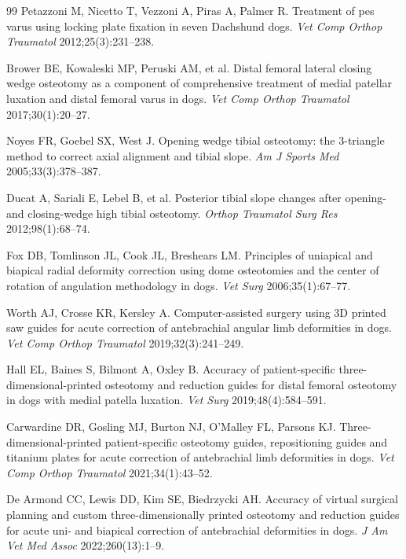 \begin{thebibliography}{99}
 Petazzoni M, Nicetto T, Vezzoni A, Piras A, Palmer R. Treatment of pes varus using locking
plate fixation in seven Dachshund dogs. \emph{Vet Comp Orthop Traumatol} 2012;25(3):231--238.

 Brower BE, Kowaleski MP, Peruski AM, et al. Distal femoral lateral closing wedge osteotomy as a
component of comprehensive treatment of medial patellar luxation and distal femoral varus in dogs. \emph{Vet Comp
Orthop Traumatol} 2017;30(1):20--27. 

 Noyes FR, Goebel SX, West J. Opening wedge tibial osteotomy: the 3-triangle method to correct axial
alignment and tibial slope. \emph{Am J Sports Med} 2005;33(3):378--387. 

 Ducat A, Sariali E, Lebel B, et al. Posterior tibial slope changes after opening- and
closing-wedge high tibial osteotomy. \emph{Orthop Traumatol Surg Res} 2012;98(1):68--74. 

 Fox DB, Tomlinson JL, Cook JL, Breshears LM. Principles of uniapical and biapical radial deformity
correction using dome osteotomies and the center of rotation of angulation methodology in dogs. \emph{Vet Surg}
2006;35(1):67--77. 

 Worth AJ, Crosse KR, Kersley A. Computer-assisted surgery using 3D printed saw guides for acute
correction of antebrachial angular limb deformities in dogs. \emph{Vet Comp Orthop Traumatol} 2019;32(3):241--249.

 Hall EL, Baines S, Bilmont A, Oxley B. Accuracy of patient-specific three-dimensional-printed
osteotomy and reduction guides for distal femoral osteotomy in dogs with medial patella luxation. \emph{Vet Surg}
2019;48(4):584--591. 

 Carwardine DR, Gosling MJ, Burton NJ, O'Malley FL, Parsons KJ. Three-dimensional-printed
patient-specific osteotomy guides, repositioning guides and titanium plates for acute correction of antebrachial limb
deformities in dogs. \emph{Vet Comp Orthop Traumatol} 2021;34(1):43--52. 

 De Armond CC, Lewis DD, Kim SE, Biedrzycki AH. Accuracy of virtual surgical planning and custom
three-dimensionally printed osteotomy and reduction guides for acute uni- and biapical correction of antebrachial
deformities in dogs. \emph{J Am Vet Med Assoc} 2022;260(13):1--9. 


\end{thebibliography}
